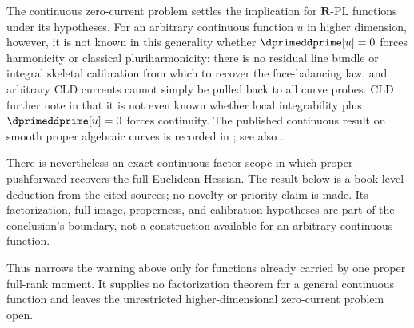 \begin{warning}{The continuous zero-current problem}
\label{warn:appM-continuous-zero-current}
 settles the implication for
\(\mathbf R\)-PL functions under its hypotheses.  For an arbitrary continuous
function \(u\) in higher dimension, however, it is not known in this
generality whether \(\dprimeddprime[u]=0\) forces harmonicity or classical
pluriharmonicity: there is no residual line bundle or integral skeletal
calibration from which to recover the face-balancing law, and arbitrary CLD
currents cannot simply be pulled back to all curve probes.  CLD further note
in \cite[Remark~7.8.3]{CLD25} that it is not even known whether local
integrability plus \(\dprimeddprime[u]=0\) forces continuity.  The published
continuous result on smooth proper algebraic curves is recorded in
; see also
.
\end{warning}

There is nevertheless an exact continuous factor scope in which proper
pushforward recovers the full Euclidean Hessian.  The result below is a
book-level deduction from the cited sources; no novelty or priority claim is
made.  Its factorization, full-image, properness, and calibration hypotheses
are part of the conclusion's boundary, not a construction available for an
arbitrary continuous function.

\begingroup
\let\qquad\quad

\endgroup
\begingroup
\makeatletter
\let\pzerosixproper@original@nonumberplain\th@nonumberplain
\def\th@nonumberplain{%
  \pzerosixproper@original@nonumberplain
  \def\@opargbegintheorem##1##2##3{%
    \item[\theorem@headerfont\hskip\labelsep ##3\theorem@separator]}}
\makeatother

\endgroup

Thus  narrows the warning above only
for functions already carried by one proper full-rank moment.  It supplies no
factorization theorem for a general continuous function and leaves the
unrestricted higher-dimensional zero-current problem open.

